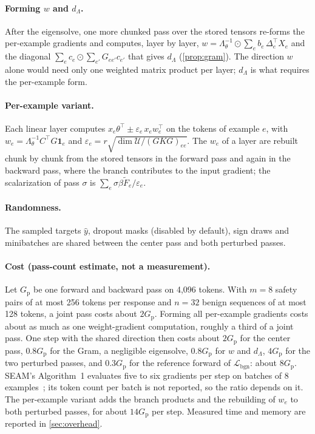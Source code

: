 \documentclass[11pt]{article}
\newcommand{\U}{\mathcal{U}}
\newcommand{\Lbgn}{\mathcal{L}_{\mathrm{bgn}}}
\newcommand{\Lam}{\Lambda_{\theta}}
\newcommand{\Ft}{\widetilde{F}}
\begin{document}
\paragraph{Forming $w$ and $d_\Lambda$.}
After the eigensolve, one more chunked pass over the stored tensors re-forms the per-example gradients and computes, layer by layer, $w=\Lam^{-1}\odot\sum_eb_e\,\Delta_e^\top X_e$ and the diagonal $\sum_ec_e\odot\sum_{e'}G_{ee'}c_{e'}$ that gives $d_\Lambda$ (\cref{prop:gram}). The direction $w$ alone would need only one weighted matrix product per layer; $d_\Lambda$ is what requires the per-example form.

\paragraph{Per-example variant.}
Each linear layer computes $x_e\theta^\top\pm\varepsilon_e\,x_ew_e^\top$ on the tokens of example $e$, with $w_e=\Lam^{-1}C^\top G\mathbf 1_e$ and $\varepsilon_e=r\sqrt{\dim\U/(GKG)_{ee}}$. The $w_e$ of a layer are rebuilt chunk by chunk from the stored tensors in the forward pass and again in the backward pass, where the branch contributes to the input gradient; the scalarization of pass $\sigma$ is $\sum_e\sigma\beta\Ft_e/\varepsilon_e$.

\paragraph{Randomness.}
The sampled targets $\hat y$, dropout masks (disabled by default), sign draws and minibatches are shared between the center pass and both perturbed passes.

\paragraph{Cost (pass-count estimate, not a measurement).}
Let $G_{\mathrm{p}}$ be one forward and backward pass on 4{,}096 tokens. With $m=8$ safety pairs of at most 256 tokens per response and $n=32$ benign sequences of at most 128 tokens, a joint pass costs about $2G_{\mathrm{p}}$. Forming all per-example gradients costs about as much as one weight-gradient computation, roughly a third of a joint pass. One step with the shared direction then costs about $2G_{\mathrm{p}}$ for the center pass, $0.8G_{\mathrm{p}}$ for the Gram, a negligible eigensolve, $0.8G_{\mathrm{p}}$ for $w$ and $d_\Lambda$, $4G_{\mathrm{p}}$ for the two perturbed passes, and $0.3G_{\mathrm{p}}$ for the reference forward of $\Lbgn$: about $8G_{\mathrm{p}}$. SEAM's Algorithm~1 evaluates five to six gradients per step on batches of 8 examples~\citep{wang2026seam}; its token count per batch is not reported, so the ratio depends on it. The per-example variant adds the branch products and the rebuilding of $w_e$ to both perturbed passes, for about $14G_{\mathrm{p}}$ per step. Measured time and memory are reported in \cref{sec:overhead}.
\end{document}
